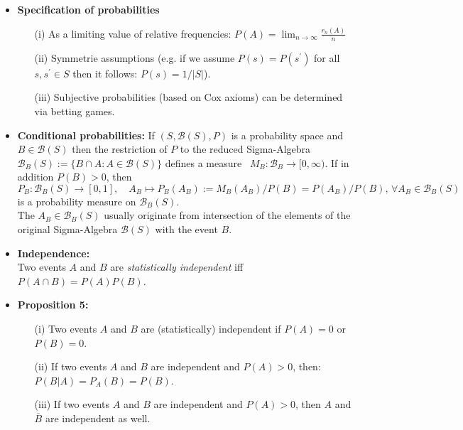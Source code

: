 \begin{itemize}
\item {\bf Specification of probabilities}
\begin{itemize}
\item[(i)] As a limiting value of relative frequencies: $P(A) = \lim_{n\to \infty} \frac{r_n(A)}{n}$
\item[(ii)] Symmetrie assumptions (e.g. if we assume $P(s)=P(s^\prime)$ for all $s,s^\prime \in S$ then it follows: $P(s) = 1/|S|$).
\item[(iii)] Subjective probabilities (based on Cox axioms) can be determined via betting games.
\end{itemize}
\item {\bf Conditional probabilities:}
If $(S,\mathcal{B}(S), P)$ is a probability space and $B \in \mathcal{B}(S)$ then the restriction of $P$ to the reduced Sigma-Algebra $\mathcal{B}_B(S):=\{B\cap A: A \in \mathcal{B}(S)\}$ defines a measure \ $M_B: \mathcal{B}_B \to [0,\infty)$. If in addition $P(B) >0$, then $P_B: \mathcal{B}_B(S) \to [0,1], \quad A_B \mapsto P_B(A_B) :=  M_B(A_B)/P(B)=P(A_B)/P(B), \, \forall A_B \in \mathcal{B}_B(S)$ is a probability measure on $\mathcal{B}_B(S)$.\\
The $A_B\in \mathcal{B}_B(S)$ usually originate from intersection of the elements of the original Sigma-Algebra $\mathcal{B}(S)$ with the event $B$.
\item {\bf Independence:}\\
Two events $A$ and $B$ are {\it statistically independent} iff $P(A\cap B) = P(A) P(B)$.
\item {\bf Proposition 5:} 
\begin{itemize}
\item[(i)] Two events $A$ and $B$ are (statistically) independent if $P(A)=0$ or $P(B)=0$.
\item[(ii)] If two events $A$ and $B$ are independent and $P(A)>0$, then: $P(B|A)=P_A(B)=P(B)$.
\item[(iii)] If two events $A$ and $B$ are independent and $P(A)>0$, then $A$ and $\overline{B}$ are independent as well.
\end{itemize}

\end{itemize}

